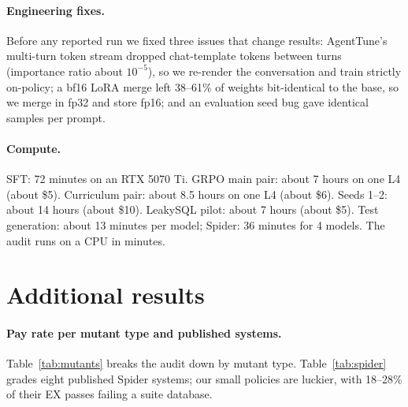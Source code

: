 \documentclass{article}
\begin{document}
\paragraph{Engineering fixes.}
Before any reported run we fixed three issues that change results: AgentTune's multi-turn token stream dropped chat-template tokens between turns (importance ratio about $10^{-5}$), so we re-render the conversation and train strictly on-policy; a bf16 LoRA merge left 38--61\% of weights bit-identical to the base, so we merge in fp32 and store fp16; and an evaluation seed bug gave identical samples per prompt.

\paragraph{Compute.}
SFT: 72 minutes on an RTX 5070 Ti. GRPO main pair: about 7 hours on one L4 (about \$5). Curriculum pair: about 8.5 hours on one L4 (about \$6). Seeds 1--2: about 14 hours (about \$10). LeakySQL pilot: about 7 hours (about \$5). Test generation: about 13 minutes per model; Spider: 36 minutes for 4 models. The audit runs on a CPU in minutes.

\section{Additional results}
\label{app:results}

\paragraph{Pay rate per mutant type and published systems.}
Table~\ref{tab:mutants} breaks the audit down by mutant type. Table~\ref{tab:spider} grades eight published Spider systems; our small policies are luckier, with 18--28\% of their EX passes failing a suite database.
\begin{table}[ht]
\caption{\textbf{Pay rate per mutant type.} Share of audit mutants paid in full (\%). Set, $D_0$: set match on the original database; $\tilde R$: strict single-DB reward; $R$, blind: strict CF reward with blind copies; $n$: mutants.}
\label{tab:mutants}
\centering\small

\end{table}
\begin{table}[ht]
\caption{\textbf{Published Spider systems pass test-suite-failing queries.} ESM+ predictions~\citep{ascoli2025etm} graded with our strict comparator. Lucky share: EX passes that fail a test-suite database (\%, Wilson 95\% CI). Lucky shares are upper bounds, because some suite failures are ties or ambiguous references.}
\label{tab:spider}
\centering\small

\end{table}
\end{document}
